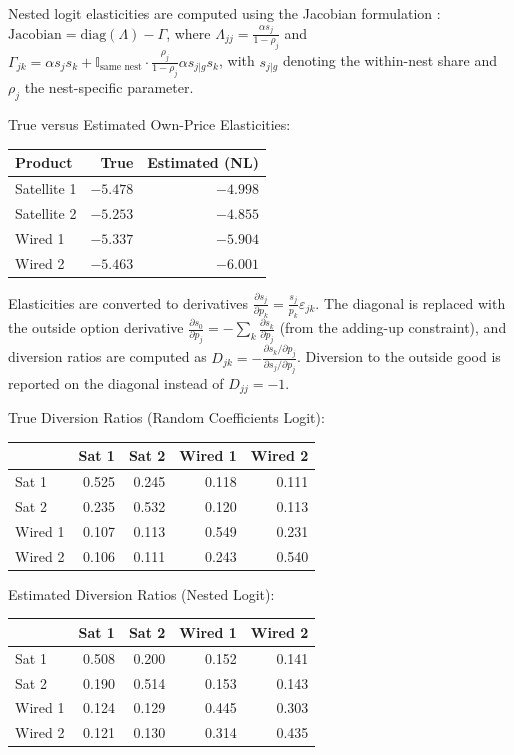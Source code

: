 \documentclass[english,11pt]{article}
\begin{document}
Nested logit elasticities are computed using the Jacobian formulation \citep{conlon2020pyblp, conlon2021diversion}: $\text{Jacobian} = \text{diag}(\Lambda) - \Gamma$, where $\Lambda_{jj} = \frac{\alpha s_j}{1-\rho_j}$ and $\Gamma_{jk} = \alpha s_j s_k + \mathbb{I}_{\text{same nest}} \cdot \frac{\rho_j}{1-\rho_j} \alpha s_{j|g} s_k$, with $s_{j|g}$ denoting the within-nest share and $\rho_j$ the nest-specific parameter.

\bigskip

\noindent True versus Estimated Own-Price Elasticities:
\begin{center}
\begin{tabular}{lrr}
\hline
Product & True & Estimated (NL) \\
\hline
Satellite 1 & $-5.478$ & $-4.998$ \\
Satellite 2 & $-5.253$ & $-4.855$ \\
Wired 1 & $-5.337$ & $-5.904$ \\
Wired 2 & $-5.463$ & $-6.001$ \\
\hline
\end{tabular}
\end{center}

\noindent Elasticities are converted to derivatives $\frac{\partial s_j}{\partial p_k} = \frac{s_j}{p_k}\varepsilon_{jk}$. The diagonal is replaced with the outside option derivative $\frac{\partial s_0}{\partial p_j} = -\sum_k \frac{\partial s_k}{\partial p_j}$ (from the adding-up constraint), and diversion ratios are computed as $D_{jk} = -\frac{\partial s_k/\partial p_j}{\partial s_j/\partial p_j}$. Diversion to the outside good is reported on the diagonal instead of $D_{jj}=-1$. 

\bigskip

\noindent True Diversion Ratios (Random Coefficients Logit):
\begin{center}
\begin{tabular}{lrrrr}
\hline
 & Sat 1 & Sat 2 & Wired 1 & Wired 2 \\
\hline
Sat 1 & 0.525 & 0.245 & 0.118 & 0.111 \\
Sat 2 & 0.235 & 0.532 & 0.120 & 0.113 \\
Wired 1 & 0.107 & 0.113 & 0.549 & 0.231 \\
Wired 2 & 0.106 & 0.111 & 0.243 & 0.540 \\
\hline
\end{tabular}
\end{center}

\noindent Estimated Diversion Ratios (Nested Logit):
\begin{center}
\begin{tabular}{lrrrr}
\hline
 & Sat 1 & Sat 2 & Wired 1 & Wired 2 \\
\hline
Sat 1 & 0.508 & 0.200 & 0.152 & 0.141 \\
Sat 2 & 0.190 & 0.514 & 0.153 & 0.143 \\
Wired 1 & 0.124 & 0.129 & 0.445 & 0.303 \\
Wired 2 & 0.121 & 0.130 & 0.314 & 0.435 \\
\hline
\end{tabular}
\end{center}
\end{document}
